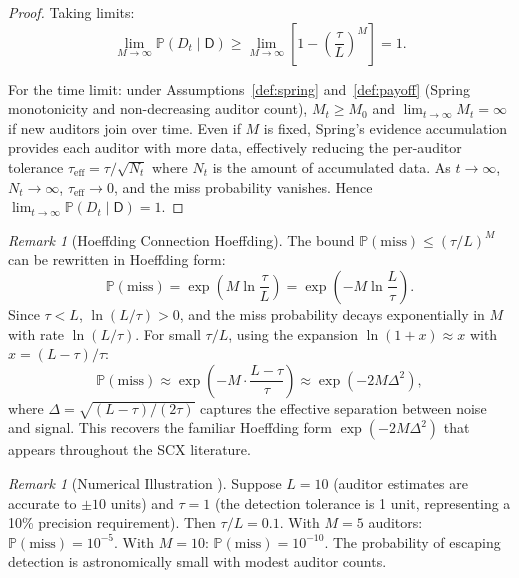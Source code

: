 \documentclass[11pt,a4paper]{article}
\theoremstyle{definition}
\theoremstyle{remark}
\newtheorem{remark}[theorem]{Remark}
\newcommand{\SCX}{\textsc{SCX}}
\newcommand{\Pbb}{\mathbb{P}}
\newcommand{\dishonest}{\mathsf{D}}
\newcommand{\threshold}{\tau}
\newcommand{\tol}{L}
\begin{document}
\begin{proof}
Taking limits:
\begin{equation}
    \lim_{M \to \infty} \Pbb(D_t \mid \dishonest)
    \geq \lim_{M \to \infty} \left[1 - \left(\frac{\threshold}{\tol}\right)^M\right] = 1.
\end{equation}

For the time limit: under Assumptions~\ref{def:spring} and~\ref{def:payoff} (Spring monotonicity and non-decreasing auditor count), $M_t \geq M_0$ and $\lim_{t \to \infty} M_t = \infty$ if new auditors join over time. Even if $M$ is fixed, Spring's evidence accumulation provides each auditor with more data, effectively reducing the per-auditor tolerance $\threshold_{\text{eff}} = \threshold / \sqrt{N_t}$ where $N_t$ is the amount of accumulated data. As $t \to \infty$, $N_t \to \infty$, $\threshold_{\text{eff}} \to 0$, and the miss probability vanishes. Hence $\lim_{t \to \infty} \Pbb(D_t \mid \dishonest) = 1$.
\end{proof}

\begin{remark}[Hoeffding Connection Hoeffding]
\label{rem:hoeffding}
The bound $\Pbb(\text{miss}) \leq (\threshold/\tol)^M$ can be rewritten in Hoeffding form:
\begin{equation}
    \Pbb(\text{miss}) = \exp\left(M \ln\frac{\threshold}{\tol}\right)
    = \exp\left(-M \ln\frac{\tol}{\threshold}\right).
\end{equation}
Since $\threshold < \tol$, $\ln(\tol/\threshold) > 0$, and the miss probability decays exponentially in $M$ with rate $\ln(\tol/\threshold)$. For small $\threshold/\tol$, using the expansion $\ln(1 + x) \approx x$ with $x = (\tol - \threshold)/\threshold$:
\begin{equation}
    \Pbb(\text{miss}) \approx \exp\left(-M \cdot \frac{\tol - \threshold}{\threshold}\right)
    \approx \exp(-2M \Delta^2),
\end{equation}
where $\Delta = \sqrt{(\tol - \threshold)/(2\threshold)}$ captures the effective separation between noise and signal. This recovers the familiar Hoeffding form $\exp(-2M\Delta^2)$ that appears throughout the \SCX{} literature.
\end{remark}

\begin{remark}[Numerical Illustration ]
\label{rem:numerical}
Suppose $\tol = 10$ (auditor estimates are accurate to $\pm 10$ units) and $\threshold = 1$ (the detection tolerance is 1 unit, representing a 10\% precision requirement). Then $\threshold/\tol = 0.1$. With $M = 5$ auditors: $\Pbb(\text{miss}) = 10^{-5}$. With $M = 10$: $\Pbb(\text{miss}) = 10^{-10}$. The probability of escaping detection is astronomically small with modest auditor counts.
\end{remark}
\end{document}
